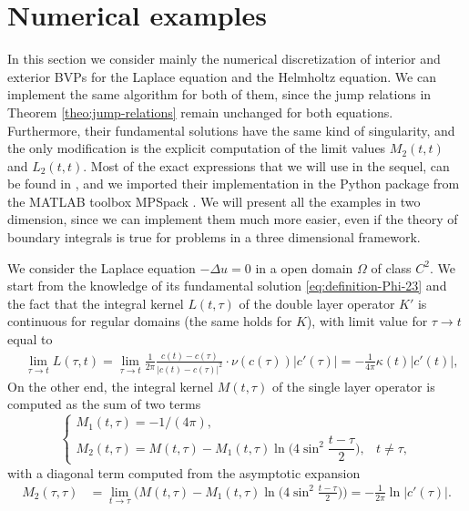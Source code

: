 \documentclass[10pt, a4paper]{article} %
\numberwithin{equation}{section}
\theoremstyle{definition}
\theoremstyle{plain}
\theoremstyle{plain}
\theoremstyle{plain}
\theoremstyle{plain}
\theoremstyle{plain}
\theoremstyle{plain}
\theoremstyle{plain}
\theoremstyle{plain}
\begin{document}
\section{Numerical examples}
\label{section:num}
In this section we consider mainly the numerical discretization of interior and 
exterior BVPs for the Laplace equation and the Helmholtz equation.
We can implement the same algorithm for both of them, since the jump relations 
in Theorem \ref{theo:jump-relations}
remain unchanged for both equations. Furthermore, their fundamental solutions have
the same kind of singularity, and the only modification is the explicit computation of
the limit values $M_2(t,t)$ and $L_2(t,t)$.
Most of the exact expressions that we will use in the sequel, can be found in 
\cite{colton-kress:book}, and we imported their implementation in the Python package
from the MATLAB toolbox MPSpack \cite{mpspack}. We will present all the examples in two dimension, 
since we can implement them much more easier, even if the theory of boundary integrals 
is true for problems in a three dimensional framework.
\par
We consider the Laplace equation $-\Delta u = 0$ in a open domain $\Omega$ of class $C^2$. 
We start from the knowledge of its fundamental solution \eqref{eq:definition-Phi-23} and
the fact that the integral kernel $L(t,\tau)$ of the double layer operator $K'$ is continuous
for regular domains (the same holds for $K$), with limit value for $\tau \to t$ equal to
\begin{align}
 &\lim_{\tau \to t}L(\tau,t)=\lim_{\tau \to t}\frac{1}{2\pi}\frac{c(t)-c(\tau)}{|c(t) - c(\tau)|^2}\cdot\nu(c(\tau))|c'(\tau)|
 = -\frac{1}{4\pi}\kappa(t)|c'(t)|,
\end{align}
On the other end, the integral kernel $M(t,\tau)$ of the single layer operator 
is computed as the sum of two terms
\begin{equation}
\begin{cases}
 M_1(t,\tau)= -1/(4\pi), \\
 M_2(t,\tau)=M(t,\tau) - M_1(t,\tau)\ln\Big(4\sin^2\dfrac{t-\tau}{2}\Big), & t\neq \tau,
\end{cases}
\end{equation}
with a diagonal term computed from the asymptotic expansion
\begin{align}
 M_2(\tau,\tau)&=\lim_{t\to\tau} \Big(M(t,\tau) - M_1(t,\tau)\ln\Big(4\sin^2\frac{t-\tau}{2}\Big)\Big)
 =-\frac{1}{2\pi}\ln|c'(\tau)|.
\end{align}
\end{document}
